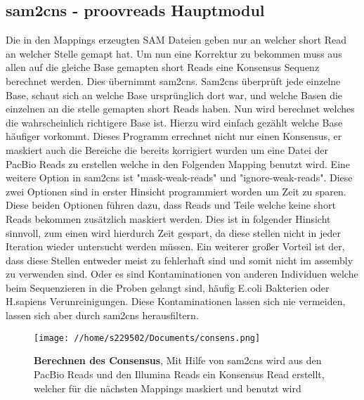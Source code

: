 \documentclass{scrartcl}
\begin{document}
\subsection{sam2cns - proovreads Hauptmodul}
\label{sec-7-2}
Die in den Mappings erzeugten SAM Dateien geben nur an welcher short Read an welcher Stelle gemapt hat. Um nun eine Korrektur zu bekommen muss aus allen
auf die gleiche Base gemapten short Reads eine Konsensus Sequenz berechnet werden. Dies übernimmt sam2cns.
Sam2cns überprüft jede einzelne Base, schaut sich an welche Base ursprünglich dort war, und welche Basen die einzelnen an die stelle gemapten short Reads
haben. Nun wird berechnet welches die wahrscheinlich richtigere Base ist. Hierzu wird einfach gezählt welche Base häufiger vorkommt. 
Dieses Programm errechnet nicht nur einen Konsensus, er maskiert auch die Bereiche die bereits korrigiert wurden um eine Datei der PacBio Reads zu erstellen
welche in den Folgenden Mapping benutzt wird. Eine weitere Option in sam2cns ist "mask-weak-reads" und "ignore-weak-reads". Diese zwei Optionen 
sind in erster Hinsicht programmiert worden um Zeit zu sparen. Diese beiden Optionen führen dazu, dass Reads und Teile welche keine short Reads bekommen
zusätzlich maskiert werden. Dies ist in folgender Hinsicht sinnvoll, zum einen wird hierdurch Zeit gespart, da diese stellen nicht in jeder Iteration wieder
untersucht werden müssen. Ein weiterer großer Vorteil ist der, dass diese Stellen entweder meist zu fehlerhaft sind und somit nicht im assembly zu verwenden sind.
Oder es sind Kontaminationen von anderen Individuen welche beim Sequenzieren in die Proben gelangt sind, häufig E.coli Bakterien oder H.sapiens Verunreinigungen.
Diese Kontaminationen lassen sich nie vermeiden, lassen sich aber durch sam2cns herausfiltern. 
\begin{figure}[!hb]
\texttt{[image: //home/s229502/Documents/consens.png]}
\caption[Berechnen des Consensus]{\textbf{Berechnen des Consensus}, Mit Hilfe von sam2cns wird aus den PacBio Reads und den Illumina Reads ein Konsensus Read erstellt, welcher für die nächsten Mappings maskiert und benutzt wird}
\end{figure}
\end{document}
